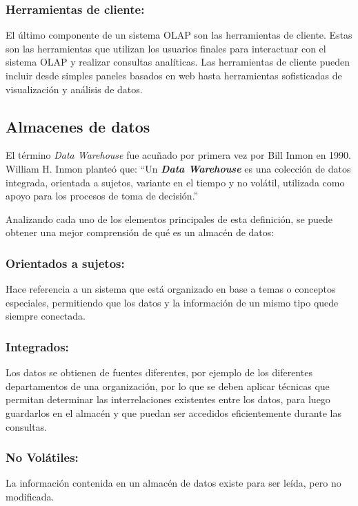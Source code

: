 \subsubsection{Herramientas de cliente:}
El último componente de un sistema OLAP son las herramientas de cliente. Estas son las herramientas que utilizan los 
usuarios finales para interactuar con el sistema OLAP y realizar consultas analíticas. Las herramientas de cliente pueden 
incluir desde simples paneles basados en web hasta herramientas sofisticadas de visualización y análisis de datos.

\subsection{Almacenes de datos}

El término \emph{Data Warehouse} fue acuñado por primera vez por Bill Inmon en 1990. William H. Inmon planteó que: 
“Un \textbf{\emph{Data Warehouse}} es una colección de datos integrada, orientada a sujetos, variante en el tiempo y 
no volátil, utilizada como apoyo para los procesos de toma de decisión.”

Analizando cada uno de los elementos principales de esta definición, se puede obtener una mejor comprensión de qué es un 
almacén de datos:

\subsubsection{Orientados a sujetos:}
%
Hace referencia a un sistema que est\'a organizado en base a temas o conceptos especiales, permitiendo que los datos y la 
información de un mismo tipo quede siempre conectada.

\subsubsection{Integrados:}
Los datos se obtienen de fuentes diferentes, por ejemplo de los diferentes departamentos de una organización, por lo que se 
deben aplicar técnicas que permitan determinar las interrelaciones existentes entre los datos, para luego guardarlos en el 
almacén y que puedan ser accedidos eficientemente durante las consultas.

\subsubsection{No Vol\'atiles:}
La información contenida en un almac\'en de datos existe para ser leída, pero no modificada.

